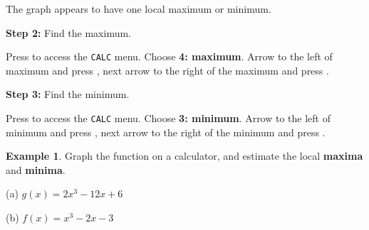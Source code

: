 \documentclass{report}
\theoremstyle{definition}
\newtheorem{example}{\bf Example}
\begin{document}
\vspace{-0.5cm}

\begin{center}
\begin{minipage}[t]{0.85\linewidth}
The graph appears to have one local maximum or minimum.\\
\end{minipage}
\end{center}

\textbf{Step 2:} Find the maximum.\\

\vspace{-0.5cm}

\begin{center}
\begin{minipage}[t]{0.85\linewidth}
Press   to access the \texttt{CALC} menu. Choose \textbf{4: maximum}. Arrow to the left of maximum and press , next arrow to the right of the maximum and press .\\
\end{minipage}
\end{center}

\textbf{Step 3:} Find the minimum.\\

\vspace{-0.5cm}

\begin{center}
\begin{minipage}[t]{0.85\linewidth}
Press   to access the \texttt{CALC} menu. Choose \textbf{3: minimum}. Arrow to the left of minimum and press , next arrow to the right of the minimum and press .\\
\end{minipage}
\end{center}


\begin{example}
Graph the function on a calculator, and estimate the local \textbf{maxima} and \textbf{minima}. 
\end{example}

\begin{minipage}[t]{0.45\linewidth}
(a) $g(x)=2x^3-12x+6$
\end{minipage}
\hfill
\begin{minipage}[t]{0.45\linewidth}
(b) $f(x)=x^3-2x-3$
\end{minipage}
\end{document}
